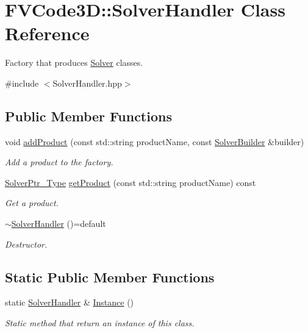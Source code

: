 \hypertarget{classFVCode3D_1_1SolverHandler}{}\section{F\+V\+Code3D\+:\+:Solver\+Handler Class Reference}
\label{classFVCode3D_1_1SolverHandler}


Factory that produces \hyperlink{classFVCode3D_1_1Solver}{Solver} classes.  




{\ttfamily \#include $<$Solver\+Handler.\+hpp$>$}

\subsection*{Public Member Functions}
\begin{DoxyCompactItemize}
\item 
void \hyperlink{classFVCode3D_1_1SolverHandler_a2d1850e99d392d23fa2a492e0b55ab08}{add\+Product} (const std\+::string product\+Name, const \hyperlink{namespaceFVCode3D_ae1d65e23bd2373e382d1f397337de344}{Solver\+Builder} \&builder)
\begin{DoxyCompactList}\small\item\em Add a product to the factory. \end{DoxyCompactList}\item 
\hyperlink{namespaceFVCode3D_a0b32227a4e5847c2fb27215fb81d9363}{Solver\+Ptr\+\_\+\+Type} \hyperlink{classFVCode3D_1_1SolverHandler_a15e31d74d5411d2e3eb3ba00140dbeed}{get\+Product} (const std\+::string product\+Name) const 
\begin{DoxyCompactList}\small\item\em Get a product. \end{DoxyCompactList}\item 
\hyperlink{classFVCode3D_1_1SolverHandler_af8678d9ce1c7c918e286a986b743e2f3}{$\sim$\+Solver\+Handler} ()=default
\begin{DoxyCompactList}\small\item\em Destructor. \end{DoxyCompactList}\end{DoxyCompactItemize}
\subsection*{Static Public Member Functions}
\begin{DoxyCompactItemize}
\item 
static \hyperlink{classFVCode3D_1_1SolverHandler}{Solver\+Handler} \& \hyperlink{classFVCode3D_1_1SolverHandler_ada712461029e9fdf623260937afe4da3}{Instance} ()
\begin{DoxyCompactList}\small\item\em Static method that return an instance of this class. \end{DoxyCompactList}\end{DoxyCompactItemize}
